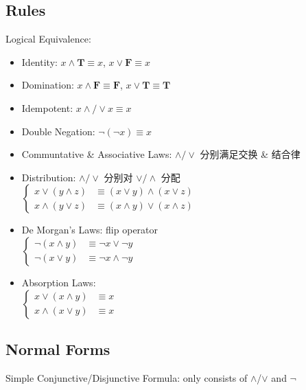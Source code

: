 \documentclass[12pt, a4paper, UTF8, openany]{ctexbook}
\newcommand{\true}{\mathbf{T}}
\newcommand{\false}{\mathbf{F}}
\begin{document}
        \subsection{Rules}
        Logical Equivalence: 
        \begin{itemize}
            \item Identity: $x \land \true \equiv x$, $x \lor \false \equiv x$
            \item Domination: $x \land \false \equiv \false$, $x \lor \true \equiv \true$
            \item Idempotent: $x \land/\lor x \equiv x$
            \item Double Negation: $\lnot(\lnot x) \equiv x$
            \item Communtative \& Associative Laws: $\land/\lor$ 分别满足交换 \& 结合律
            \item Distribution: $\land/\lor$ 分别对 $\lor/\land$ 分配 \\
                $\begin{cases}
                    x \lor (y \land z) & \equiv (x \lor y) \land (x \lor z) \\
                    x \land (y \lor z) & \equiv (x \land y) \lor (x \land z)
                \end{cases}$
            \item De Morgan's Laws: flip operator \\
                $\begin{cases}
                    \lnot (x \land y) & \equiv \lnot x \lor \lnot y \\
                    \lnot (x \lor y) & \equiv \lnot x \land \lnot y
                \end{cases}$
            \item Absorption Laws: \\
                $\begin{cases}
                    x \lor (x \land y) & \equiv x \\
                    x \land (x \lor y) & \equiv x
                \end{cases}$
        \end{itemize}

        \subsection{Normal Forms}
        Simple Conjunctive/Disjunctive Formula: only consists of $\land$/$\lor$ and $\lnot$
\end{document}
